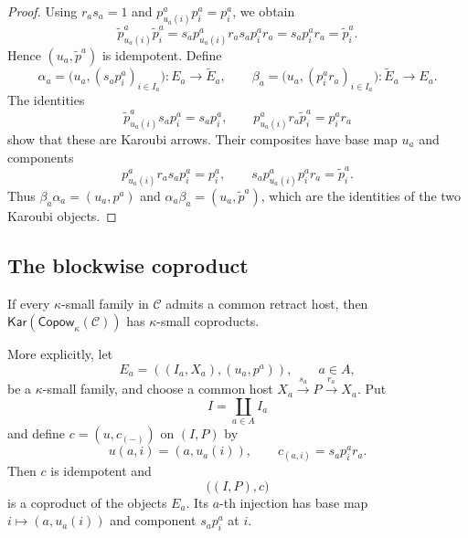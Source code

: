 \documentclass[runningheads,envcountsame]{llncs}
\newcommand{\Copow}{\mathsf{Copow}}
\newcommand{\Kar}{\mathsf{Kar}}
\begin{document}
\begin{proof}
Using $r_as_a=1$ and $p^a_{u_a(i)}p^a_i=p^a_i$, we obtain
$$
\widetilde p^a_{u_a(i)}\widetilde p^a_i
=
s_ap^a_{u_a(i)}r_as_ap^a_ir_a
=
s_ap^a_ir_a
=
\widetilde p^a_i.
$$
Hence $(u_a,\widetilde p^a)$ is idempotent.  Define
$$
\alpha_a=
\bigl(u_a,(s_ap^a_i)_{i\in I_a}\bigr):E_a\longrightarrow\widetilde E_a,
\qquad
\beta_a=
\bigl(u_a,(p^a_ir_a)_{i\in I_a}\bigr):
\widetilde E_a\longrightarrow E_a.
$$
The identities
$$
\widetilde p^a_{u_a(i)}s_ap^a_i=s_ap^a_i,
\qquad
p^a_{u_a(i)}r_a\widetilde p^a_i=p^a_ir_a
$$
show that these are Karoubi arrows.  Their composites have base map $u_a$
and components
$$
p^a_{u_a(i)}r_as_ap^a_i=p^a_i,
\qquad
s_ap^a_{u_a(i)}p^a_ir_a=\widetilde p^a_i.
$$
Thus $\beta_a\alpha_a=(u_a,p^a)$ and
$\alpha_a\beta_a=(u_a,\widetilde p^a)$, which are the identities of the two
Karoubi objects.
\end{proof}

\subsection{The blockwise coproduct}
\label{app:coproduct-details}

\begin{proposition}
\label{prop:kar-coprod-app}
If every $\kappa$-small family in $\mathcal C$ admits a common retract host,
then $\Kar(\Copow_\kappa(\mathcal C))$ has $\kappa$-small coproducts.

More explicitly, let
$$
E_a=((I_a,X_a),(u_a,p^a)),
\qquad a\in A,
$$
be a $\kappa$-small family, and choose a common host
$X_a\xrightarrow{s_a}P\xrightarrow{r_a}X_a$.  Put
$$
I=\coprod_{a\in A}I_a
$$
and define $c=(u,c_{(-)})$ on $(I,P)$ by
$$
u(a,i)=(a,u_a(i)),
\qquad
c_{(a,i)}=s_ap^a_ir_a.
$$
Then $c$ is idempotent and
$$
\bigl((I,P),c\bigr)
$$
is a coproduct of the objects $E_a$.  Its $a$-th injection has base map
$i\mapsto(a,u_a(i))$ and component $s_ap^a_i$ at $i$.
\end{proposition}
\end{document}
